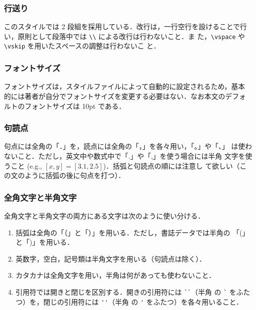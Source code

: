 \documentclass[a4j]{matsushita-zemi}
\begin{document}
\subsubsection{行送り}

このスタイルでは 2 段組を採用している．改行は，一行空行を設けることで行
い，原則として段落中では \verb|\\| による改行は行わないこと．ま
た，\verb|\vspace| や\verb|\vskip| を用いたスペースの調整は行わないこ
と．


\subsubsection{フォントサイズ}

フォントサイズは，スタイルファイルによって自動的に設定されるため，基本
的には著者が自分でフォントサイズを変更する必要はない．なお本文のデフォ
ルトのフォントサイズは 10pt である．


\subsubsection{句読点}

句点には全角の「．」を，読点には全角の「，」を各々用い，「。」や「、」
は使わないこと．ただし，英文中や数式中で「.」や「,」を使う場合には半角
文字を使うこと (e.g., $[x, y]=[3.1, 2.5]$)．括弧と句読点の順には注意し
て欲しい（この文のように括弧の後に句点を打つ）．

\subsubsection{全角文字と半角文字}

全角文字と半角文字の両方にある文字は次のように使い分ける．

\begin{enumerate}
\item 括弧は全角の「（」と「）」を用いる．ただし，書誌データでは半角の
  「(」と「)」を用いる．

\item 英数字，空白，記号類は半角文字を用いる（句読点は除く）．

\item カタカナは全角文字を用い，半角は何があっても使わないこと．

\item 引用符では開きと閉じを区別する．開きの引用符には \verb|``|（半角
  の \verb|`| をふたつ）を，閉じの引用符には \verb|''|（半角
  の \verb|'| をふたつ）を各々用いること．
\end{enumerate}
\end{document}
